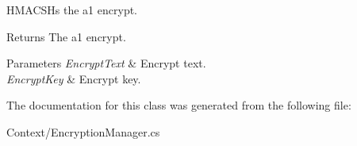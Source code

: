 H\+M\+A\+C\+S\+Hs the a1 encrypt. 

\begin{DoxyReturn}{Returns}
The a1 encrypt.
\end{DoxyReturn}

\begin{DoxyParams}{Parameters}
{\em Encrypt\+Text} & Encrypt text.\\
\hline
{\em Encrypt\+Key} & Encrypt key.\\
\hline
\end{DoxyParams}


The documentation for this class was generated from the following file\+:\begin{DoxyCompactItemize}
\item 
Context/Encryption\+Manager.\+cs\end{DoxyCompactItemize}
